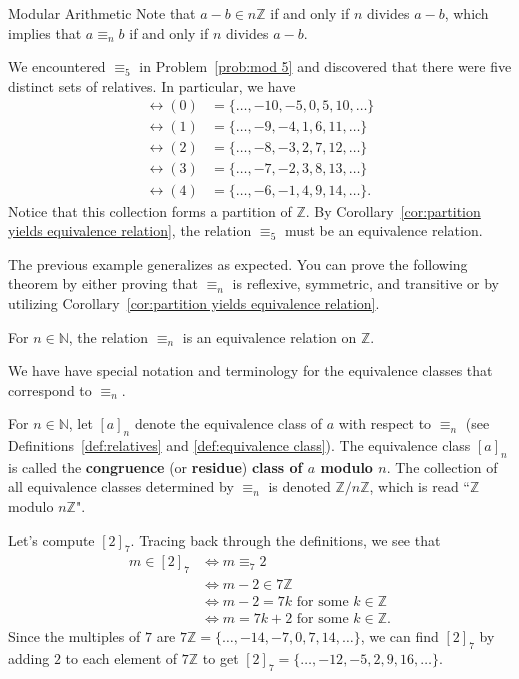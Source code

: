 \begin{section}{Modular Arithmetic}
Note that $a-b \in n\mathbb{Z}$ if and only if $n$ divides $a-b$, which implies that $a\equiv_n b$ if and only if $n$ divides $a-b$.

\begin{example}
We encountered $\equiv_5$ in Problem~\ref{prob:mod 5} and discovered that there were five distinct sets of relatives.  In particular, we have
\begin{align*}
\rel(0) & = \{\ldots, -10, -5, 0, 5, 10,\ldots\}\\
\rel(1) & = \{\ldots, -9, -4, 1, 6, 11,\ldots\}\\
\rel(2) & = \{\ldots, -8, -3, 2, 7, 12,\ldots\}\\
\rel(3) & = \{\ldots, -7, -2, 3, 8, 13,\ldots\}\\
\rel(4) & = \{\ldots, -6, -1, 4, 9, 14,\ldots\}.
\end{align*}
Notice that this collection forms a partition of $\mathbb{Z}$.  By Corollary~\ref{cor:partition yields equivalence relation}, the relation $\equiv_5$ must be an equivalence relation.
\end{example}

The previous example generalizes as expected. You can prove the following theorem by either proving that $\equiv_n$ is reflexive, symmetric, and transitive or by utilizing Corollary~\ref{cor:partition yields equivalence relation}.

\begin{theorem}
For $n\in \mathbb{N}$, the relation $\equiv_n$ is an equivalence relation on $\mathbb{Z}$.
\end{theorem}

We have have special notation and terminology for the equivalence classes that correspond to $\equiv_n$.

\begin{definition}\label{def:modulo}
For $n\in \mathbb{N}$, let $\boxed{[a]_n}$ denote the equivalence class of $a$ with respect to $\equiv_n$ (see Definitions~\ref{def:relatives} and \ref{def:equivalence class}). The equivalence class $[a]_n$ is called the \textbf{congruence} (or \textbf{residue}) \textbf{class of $a$ modulo $n$}. The collection of all equivalence classes determined by $\equiv_n$ is denoted $\boxed{\mathbb{Z}/n\mathbb{Z}}$, which is read ``$\mathbb{Z}$ modulo $n\mathbb{Z}$".
\end{definition}

\begin{example}\label{exam:twomodseven}
Let's compute $[2]_7$.  Tracing back through the definitions, we see that
\begin{align*}
m \in [2]_7 & \iff m \equiv_7 2\\
& \iff m-2\in 7\mathbb{Z}\\
& \iff m-2 = 7k \text{ for some $k\in \mathbb{Z}$}\\
& \iff m = 7k+2 \text{ for some $k\in \mathbb{Z}$}.
\end{align*}
Since the multiples of $7$ are $7\mathbb{Z} = \{\ldots,-14,-7,0,7,14,\ldots\}$, we can find $[2]_7$ by adding $2$ to each element of $7\mathbb{Z}$ to get $[2]_7 = \{\ldots,-12,-5,2,9,16,\ldots\}$.
\end{example}


\end{section}
